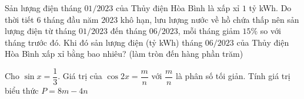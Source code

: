 \begin{ex}
Sản lượng điện tháng $01/2023$ của Thủy điện Hòa Bình là xấp xỉ $1$ tỷ kWh.  
Do thời tiết $6$ tháng đầu năm $2023$ khô hạn, lưu lượng nước về hồ chứa thấp nên sản lượng điện từ tháng $01/2023$ đến tháng $06/2023$, mỗi tháng giảm $15\%$ so với tháng trước đó.  
Khi đó sản lượng điện (tỷ kWh) tháng $06/2023$ của Thủy điện Hòa Bình xấp xỉ bằng bao nhiêu? (làm tròn đến hàng phần trăm)



\end{ex}
\begin{ex}
Cho $\sin x = \dfrac{1}{3}$. Giá trị của $\cos2x = \dfrac{m}{n}$ với $\dfrac{m}{n}$ là phân số tối giản.
Tính giá trị biểu thức $P=8m-4n$
\end{ex}
